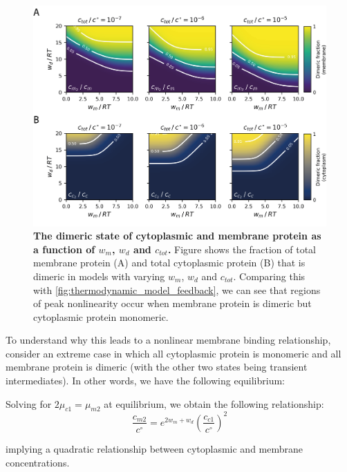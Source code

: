 \documentclass[12pt]{"report"}
\newcommand{\mycaption}[2]{\caption[#1]{\textbf{#1.} #2}}
\begin{document}
\begin{figure}
\includegraphics[scale=0.9]{thermodynamic_model_dimer_fractions}
\centering
\mycaption{The dimeric state of cytoplasmic and membrane protein as a function of $w_m$, $w_d$ and $c_{tot}$}{
Figure shows the fraction of total membrane protein (A) and total cytoplasmic protein (B) that is dimeric in models with varying $w_m$, $w_d$ and $c_{tot}$. Comparing this with \cref{fig:thermodynamic_model_feedback}, we can see that regions of peak nonlinearity occur when membrane protein is dimeric but cytoplasmic protein monomeric.
}
\label{fig:thermodynamic_model_dimer_fractions}
\end{figure}

To understand why this leads to a nonlinear membrane binding relationship, consider an extreme case in which all cytoplasmic protein is monomeric and all membrane protein is dimeric (with the other two states being transient intermediates). In other words, we have the following equilibrium:

\begin{center}
\end{center}

Solving for $2\mu_{c1} = \mu_{m2}$ at equilibrium, we obtain the following relationship:
\begin{equation}
\frac{c_{m2}}{c^{\circ}} = e^{2w_m + w_d} \left(\frac{c_{c1}}{c^{\circ}}\right)^2
\end{equation}

implying a quadratic relationship between cytoplasmic and membrane concentrations.\\
\end{document}
